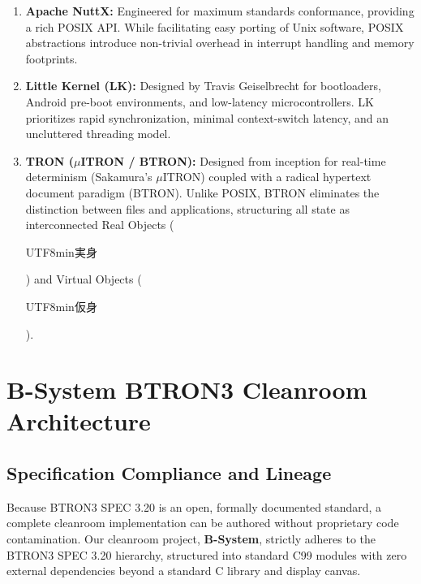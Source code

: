 \documentclass[10pt,journal,compsoc,twocolumn]{article}
\newcommand{\ja}[1]{\begin{CJK*}{UTF8}{min}#1\end{CJK*}}
\begin{document}
\begin{enumerate}[leftmargin=*]
    \item \textbf{Apache NuttX:} Engineered for maximum standards conformance, providing a rich POSIX API. While facilitating easy porting of Unix software, POSIX abstractions introduce non-trivial overhead in interrupt handling and memory footprints.
    \item \textbf{Little Kernel (LK):} Designed by Travis Geiselbrecht for bootloaders, Android pre-boot environments, and low-latency microcontrollers. LK prioritizes rapid synchronization, minimal context-switch latency, and an uncluttered threading model.
    \item \textbf{TRON ($\mu$ITRON / BTRON):} Designed from inception for real-time determinism (Sakamura's $\mu$ITRON) coupled with a radical hypertext document paradigm (BTRON). Unlike POSIX, BTRON eliminates the distinction between files and applications, structuring all state as interconnected Real Objects (\ja{実身}) and Virtual Objects (\ja{仮身}).
\end{enumerate}

\section{B-System BTRON3 Cleanroom Architecture}
\label{sec:cleanroom}

\subsection{Specification Compliance and Lineage}
Because BTRON3 SPEC 3.20 is an open, formally documented standard, a complete cleanroom implementation can be authored without proprietary code contamination. Our cleanroom project, \textbf{B-System}, strictly adheres to the BTRON3 SPEC 3.20 hierarchy, structured into standard C99 modules with zero external dependencies beyond a standard C library and display canvas.
\end{document}
